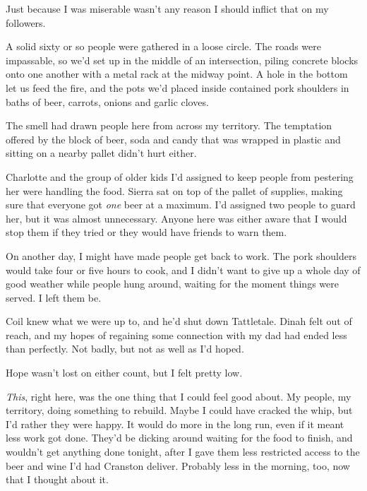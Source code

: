 





Just because I was miserable wasn't any reason I should inflict that on my followers.



A solid sixty or so people were gathered in a loose circle.  The roads were impassable, so we'd set up in the middle of an intersection, piling concrete blocks onto one another with a metal rack at the midway point.  A hole in the bottom let us feed the fire, and the pots we'd placed inside contained pork shoulders in baths of beer, carrots, onions and garlic cloves.



The smell had drawn people here from across my territory.  The temptation offered by the block of beer, soda and candy that was wrapped in plastic and sitting on a nearby pallet didn't hurt either.



Charlotte and the group of older kids I'd assigned to keep people from pestering her were handling the food.  Sierra sat on top of the pallet of supplies, making sure that everyone got \emph{one }beer at a maximum.  I'd assigned two people to guard her, but it was almost unnecessary.  Anyone here was either aware that I would stop them if they tried or they would have friends to warn them.



On another day, I might have made people get back to work.  The pork shoulders would take four or five hours to cook, and I didn't want to give up a whole day of good weather while people hung around, waiting for the moment things were served.  I left them be.



Coil knew what we were up to, and he'd shut down Tattletale.  Dinah felt out of reach, and my hopes of regaining some connection with my dad had ended less than perfectly.  Not badly, but not as well as I'd hoped.



Hope wasn't lost on either count, but I felt pretty low.



\emph{This}, right here, was the one thing that I could feel good about.  My people, my territory, doing something to rebuild.  Maybe I could have cracked the whip, but I'd rather they were happy.  It would do more in the long run, even if it meant less work got done.  They'd be dicking around waiting for the food to finish, and wouldn't get anything done tonight, after I gave them less restricted access to the beer and wine I'd had Cranston deliver.  Probably less in the morning, too, now that I thought about it.



